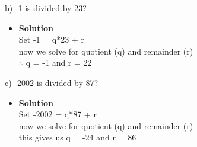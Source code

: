 \documentclass[11pt]{article}
\begin{document}
\begin{enumerate}

\begin{flushleft}
{\large b) -1 is divided by 23?}\\
\end{flushleft}





\begin{itemize}

\item \textbf{Solution}\\
\large Set -1 =  q*23 + r \\
\large now we solve for quotient (q) and remainder (r)\\
\large $\therefore$ q = -1 and r = 22\\



\end {itemize}
\end {enumerate}





\begin{enumerate}

\begin{flushleft}
{\large c) -2002 is divided by 87?}\\
\end{flushleft}





\begin{itemize}

\item \textbf{Solution}\\
\large Set -2002 = q*87 + r\\
\large now we solve for quotient (q) and remainder (r)\\
\large this gives us q = -24 and r = 86\\



\end {itemize}
\end {enumerate}



\end{document}
